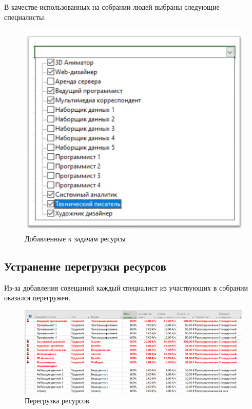 В качестве использованных на собрании людей выбраны следующие специалисты:
\FloatBarrier
\begin{figure}[h]	
	\begin{center}
		\includegraphics[width=\linewidth]{inc/2-2.png}
	\end{center}
	\captionsetup{justification=centering}
	\caption{Добавленные к задачам ресурсы}
\end{figure}
\FloatBarrier 

\subsection*{Устранение перегрузки ресурсов}
Из-за добавления совещаний каждый специалист из участвующих в собрании оказался перегружен.

\FloatBarrier
\begin{figure}[h]	
	\begin{center}
		\includegraphics[width=\linewidth]{inc/list.png}
	\end{center}
	\captionsetup{justification=centering}
	\caption{Перегрузка ресурсов}
\end{figure}
\FloatBarrier 

